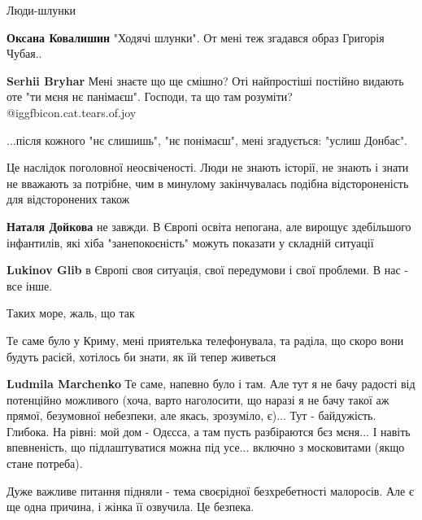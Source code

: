 \begin{itemize}
Люди-шлунки

\begin{itemize} %
\textbf{Оксана Ковалишин} "Ходячі шлунки". От мені теж згадався образ Григорія Чубая..

\textbf{Serhii Bryhar} Мені знаєте що ще смішно? Оті найпростіші постійно видають оте "ти мєня нє панімаєш". Господи, та що там розуміти?  @igg{fbicon.cat.tears.of.joy} 


...після кожного "нє слишишь", "нє понімаєш", мені згадується: "услиш Донбас".
\end{itemize} %


Це наслідок поголовної неосвіченості. Люди не знають історії, не знають і знати
не вважають за потрібне, чим в минулому закінчувалась подібна відстороненість
для відсторонених також

\begin{itemize} %
\textbf{Наталя Дойкова} не завжди. В Європі освіта непогана, але вирощує здебільшого інфантилів, які хіба "занепокоєність" можуть показати у складній ситуації

\textbf{Lukinov Glib} в Європі своя ситуація, свої передумови і свої проблеми. В нас - все інше.
\end{itemize} %

Таких море, жаль, що так


Те саме було у Криму, мені приятелька телефонувала, та раділа, що скоро вони
будуть расієй, хотілось би знати, як їй тепер живеться

\begin{itemize} %
\textbf{Ludmila Marchenko} Те саме, напевно було і там. Але тут я не бачу радості від потенційно можливого (хоча, варто наголосити, що наразі я не бачу такої аж прямої, безумовної небезпеки, але якась, зрозуміло, є)... Тут - байдужість. Глибока. На рівні: мой дом - Одєсса, а там пусть разбіраются бєз мєня... І навіть впевненість, що підлаштуватися можна під усе... включно з московитами (якщо стане потреба).
\end{itemize} %


Дуже важливе питання підняли - тема своєрідної безхребетності малоросів. Але є
ще одна причина, і жінка її озвучила. Це безпека.


\end{itemize}
